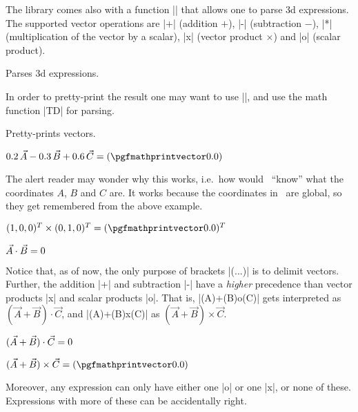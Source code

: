 \documentclass[a4paper]{ltxdoc}
\begin{document}
The library comes also with a function |\pgfmathtdparse| that allows one to parse 3d
expressions. The supported vector operations are |+| (addition $+$), |-|
(subtraction $-$), |*| (multiplication of the vector by a scalar), |x|
(vector product $\times$) and |o| (scalar product).

\begin{command}{}
   Parses 3d expressions.
\end{command}


\begin{codeexample}[]
\pgfmathresult
\end{codeexample}

In order to pretty-print the result one may want to use |\pgfmathprintvector|,
and use the math function |TD| for parsing.

\begin{command}{\pgfmathprintvector{}}
   Pretty-prints vectors.
\end{command}

\begin{codeexample}[width=6.5cm]
%
$0.2\,\vec A-0.3\,\vec B+0.6\,\vec C
=(\pgfmathprintvector\pgfmathresult)$
\end{codeexample}

The alert reader may wonder why this works, i.e.\ how would \tikzname\ ``know''
what the coordinates $A$, $B$ and $C$ are. It works because the coordinates in
\tikzname\ are global, so they get remembered from the above example.

\begin{codeexample}[width=5.2cm]
%
$(1,0,0)^T\times(0,1,0)^T=
(\pgfmathprintvector\pgfmathresult)^T$
\end{codeexample}


\begin{codeexample}[width=5.2cm]
%
$\vec A\cdot \vec B=
\pgfmathprintnumber\pgfmathresult$
\end{codeexample}


Notice that, as of now, the only purpose of brackets |(...)| is to delimit
vectors. Further, the addition |+| and subtraction |-| have a \emph{higher}
precedence than vector products |x| and scalar products |o|. That is,
|(A)+(B)o(C)| gets interpreted as $(\vec A+\vec B)\cdot\vec C$, and
|(A)+(B)x(C)| as $(\vec A+\vec B)\times\vec C$.


\begin{codeexample}[width=5.2cm]
%
$(\vec A+\vec B)\cdot\vec C=
\pgfmathprintnumber\pgfmathresult$
\end{codeexample}

\begin{codeexample}[width=5.2cm]
%
$(\vec A+\vec B)\times\vec C=
(\pgfmathprintvector\pgfmathresult)$
\end{codeexample}

Moreover, any expression can only have either one |o| or one |x|, or none of
these. Expressions with more of these can be accidentally right.
\end{document}
